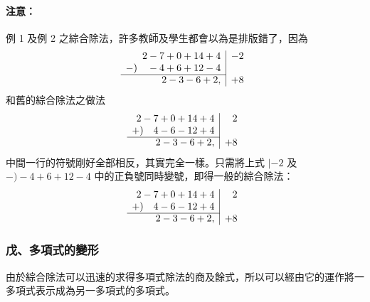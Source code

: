 \paragraph{注意：}
例 1 及例 2 之綜合除法，許多教師及學生都會以為是排版錯了，因為
\begin{equation*}
\begin{array}{r|r}
  2 - 7 + 0 + 14 + 4 & -2 \\
  -) \quad - 4 + 6 + 12 - 4 & \\ \cline{1-1}
  2 - 3 - 6 + 2, & +8
\end{array}
\end{equation*}
和舊的綜合除法之做法
\begin{equation*}
\begin{array}{r|r}
  2 - 7 + 0 + 14 + 4 & 2 \\
  +) \quad 4 - 6 - 12 + 4 & \\ \cline{1-1}
  2 - 3 - 6 + 2, & +8
\end{array}
\end{equation*}
中間一行的符號剛好全部相反，其實完全一樣。只需將上式 $|-2$ 及 $-)-4+6+12-4$ 中的正負號同時變號，即得一般的綜合除法：
\begin{equation*}
\begin{array}{r|r}
  2 - 7 + 0 + 14 + 4 & 2 \\
  +) \quad 4 - 6 - 12 + 4 & \\ \cline{1-1}
  2 - 3 - 6 + 2, & +8
\end{array}
\end{equation*}

\subsubsection*{戊、多項式的變形}\label{subsec:5-4-e}

由於綜合除法可以迅速的求得多項式除法的商及餘式，所以可以經由它的運作將一多項式表示成為另一多項式的多項式。

